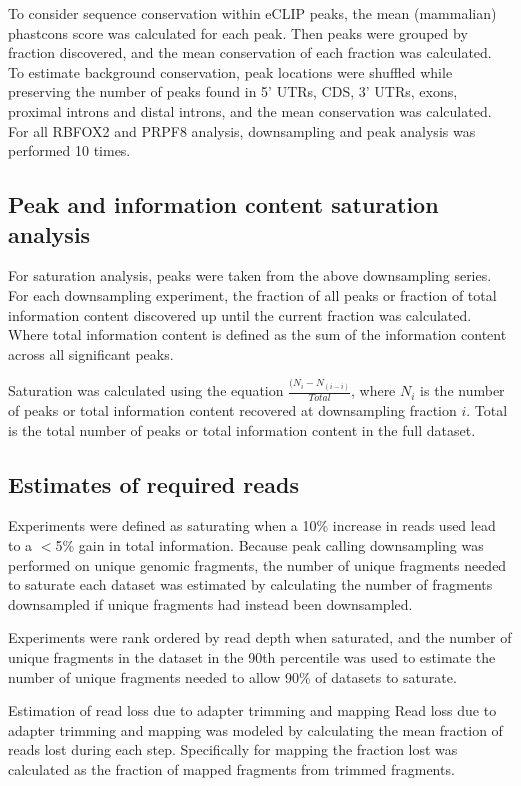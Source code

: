 To consider sequence conservation within eCLIP peaks, the mean (mammalian) phastcons score was calculated for each peak. Then peaks were grouped by fraction discovered, and the mean conservation of each fraction was calculated. To estimate background conservation, peak locations were shuffled while preserving the number of peaks found in 5’ UTRs, CDS, 3’ UTRs, exons, proximal introns and distal introns, and the mean conservation was calculated. For all RBFOX2 and PRPF8 analysis, downsampling and peak analysis was performed 10 times.

\subsection{Peak and information content saturation analysis}
For saturation analysis, peaks were taken from the above downsampling series. For each downsampling experiment, the fraction of all peaks or fraction of total information content discovered up until the current fraction was calculated. Where total information content is defined as the sum of the information content across all significant peaks.

Saturation was calculated using the equation $\frac{(N_{i}-N_{(i-i)}}{Total}$, where $N_i$ is the number of peaks or total information content recovered at downsampling fraction $i$. Total is the total number of peaks or total information content in the full dataset.

\subsection{Estimates of required reads}
Experiments were defined as saturating when a 10\% increase in reads used lead to a $<$5\% gain in total information. Because peak calling downsampling was performed on unique genomic fragments, the number of unique fragments needed to saturate each dataset was estimated by calculating the number of fragments downsampled if unique fragments had instead been downsampled.

Experiments were rank ordered by read depth when saturated, and the number of unique fragments in the dataset in the 90th percentile was used to estimate the number of unique fragments needed to allow 90\% of datasets to saturate.

Estimation of read loss due to adapter trimming and mapping
Read loss due to adapter trimming and mapping was modeled by calculating the mean fraction of reads lost during each step. Specifically for mapping the fraction lost was calculated as the fraction of mapped fragments from trimmed fragments.

